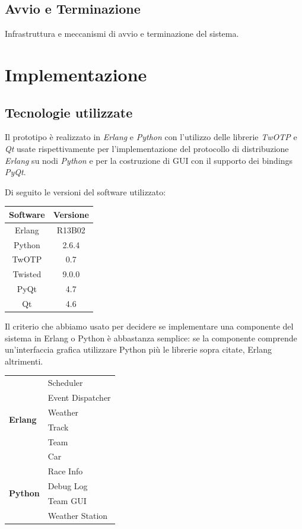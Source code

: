 \documentclass[11pt,a4paper]{report}
\begin{document}
\section{Avvio e Terminazione}
Infrastruttura e meccanismi di avvio e terminazione del sistema.

\chapter{Implementazione}
\section{Tecnologie utilizzate}
Il prototipo è realizzato in \textit{Erlang} e \textit{Python} con l'utilizzo delle librerie \textit{TwOTP} e \textit{Qt} usate rispettivamente per l'implementazione del protocollo di distribuzione \textit{Erlang} su nodi \textit{Python} e per la costruzione di GUI con il supporto dei bindings \textit{PyQt}.

Di seguito le versioni del software utilizzato:
\begin{center}
\begin{tabular}{c|c}
\textbf{Software} & \textbf{Versione}\\
\hline
Erlang & R13B02\\
\hline
Python & 2.6.4\\
\hline
TwOTP & 0.7\\
Twisted & 9.0.0\\
\hline
PyQt & 4.7\\
Qt & 4.6\\
\end{tabular}
\end{center}

Il criterio che abbiamo usato per decidere se implementare una componente del sistema in Erlang o Python è abbastanza semplice: se la componente comprende un'interfaccia grafica utilizzare Python più le librerie sopra citate, Erlang altrimenti.
\begin{center}
\begin{tabular}{|p{}|p{}|}
\hline
\multirow{6}{*}{\textbf{Erlang}} & Scheduler\\
& Event Dispatcher\\
& Weather\\
& Track\\
& Team\\
& Car \\
\hline
\multirow{4}{*}{\textbf{Python}} & Race Info\\
& Debug Log\\
& Team GUI\\
& Weather Station\\
\hline
\end{tabular}
\end{center}
\end{document}
